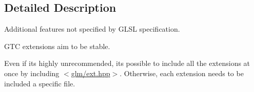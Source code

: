 \subsection{Detailed Description}
Additional features not specified by G\+L\+SL specification. 

G\+TC extensions aim to be stable.

Even if it\textquotesingle{}s highly unrecommended, it\textquotesingle{}s possible to include all the extensions at once by including $<$\hyperlink{ext_8hpp}{glm/ext.\+hpp}$>$. Otherwise, each extension needs to be included a specific file. 